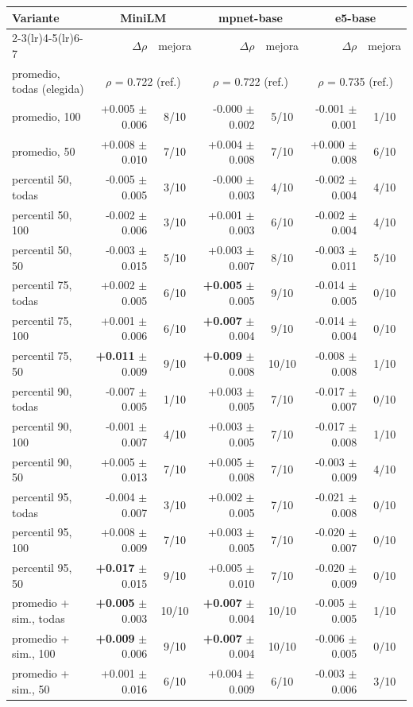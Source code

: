 \begin{tabular}{lrcrcrc}
\toprule
Variante & \multicolumn{2}{c}{MiniLM} & \multicolumn{2}{c}{mpnet-base} & \multicolumn{2}{c}{e5-base} \\
\cmidrule(lr){2-3}\cmidrule(lr){4-5}\cmidrule(lr){6-7}
 & $\Delta\rho$ & mejora & $\Delta\rho$ & mejora & $\Delta\rho$ & mejora \\
\midrule
promedio, todas (elegida) & \multicolumn{2}{c}{$\rho$ = 0.722 (ref.)} & \multicolumn{2}{c}{$\rho$ = 0.722 (ref.)} & \multicolumn{2}{c}{$\rho$ = 0.735 (ref.)} \\
promedio, 100 & +0.005 $\pm$ 0.006 & 8/10 & -0.000 $\pm$ 0.002 & 5/10 & -0.001 $\pm$ 0.001 & 1/10 \\
promedio, 50 & +0.008 $\pm$ 0.010 & 7/10 & +0.004 $\pm$ 0.008 & 7/10 & +0.000 $\pm$ 0.008 & 6/10 \\
percentil 50, todas & -0.005 $\pm$ 0.005 & 3/10 & -0.000 $\pm$ 0.003 & 4/10 & -0.002 $\pm$ 0.004 & 4/10 \\
percentil 50, 100 & -0.002 $\pm$ 0.006 & 3/10 & +0.001 $\pm$ 0.003 & 6/10 & -0.002 $\pm$ 0.004 & 4/10 \\
percentil 50, 50 & -0.003 $\pm$ 0.015 & 5/10 & +0.003 $\pm$ 0.007 & 8/10 & -0.003 $\pm$ 0.011 & 5/10 \\
percentil 75, todas & +0.002 $\pm$ 0.005 & 6/10 & \textbf{+0.005} $\pm$ 0.005 & 9/10 & -0.014 $\pm$ 0.005 & 0/10 \\
percentil 75, 100 & +0.001 $\pm$ 0.006 & 6/10 & \textbf{+0.007} $\pm$ 0.004 & 9/10 & -0.014 $\pm$ 0.004 & 0/10 \\
percentil 75, 50 & \textbf{+0.011} $\pm$ 0.009 & 9/10 & \textbf{+0.009} $\pm$ 0.008 & 10/10 & -0.008 $\pm$ 0.008 & 1/10 \\
percentil 90, todas & -0.007 $\pm$ 0.005 & 1/10 & +0.003 $\pm$ 0.005 & 7/10 & -0.017 $\pm$ 0.007 & 0/10 \\
percentil 90, 100 & -0.001 $\pm$ 0.007 & 4/10 & +0.003 $\pm$ 0.005 & 7/10 & -0.017 $\pm$ 0.008 & 1/10 \\
percentil 90, 50 & +0.005 $\pm$ 0.013 & 7/10 & +0.005 $\pm$ 0.008 & 7/10 & -0.003 $\pm$ 0.009 & 4/10 \\
percentil 95, todas & -0.004 $\pm$ 0.007 & 3/10 & +0.002 $\pm$ 0.005 & 7/10 & -0.021 $\pm$ 0.008 & 0/10 \\
percentil 95, 100 & +0.008 $\pm$ 0.009 & 7/10 & +0.003 $\pm$ 0.005 & 7/10 & -0.020 $\pm$ 0.007 & 0/10 \\
percentil 95, 50 & \textbf{+0.017} $\pm$ 0.015 & 9/10 & +0.005 $\pm$ 0.010 & 7/10 & -0.020 $\pm$ 0.009 & 0/10 \\
promedio + sim., todas & \textbf{+0.005} $\pm$ 0.003 & 10/10 & \textbf{+0.007} $\pm$ 0.004 & 10/10 & -0.005 $\pm$ 0.005 & 1/10 \\
promedio + sim., 100 & \textbf{+0.009} $\pm$ 0.006 & 9/10 & \textbf{+0.007} $\pm$ 0.004 & 10/10 & -0.006 $\pm$ 0.005 & 0/10 \\
promedio + sim., 50 & +0.001 $\pm$ 0.016 & 6/10 & +0.004 $\pm$ 0.009 & 6/10 & -0.003 $\pm$ 0.006 & 3/10 \\
\bottomrule
\end{tabular}
